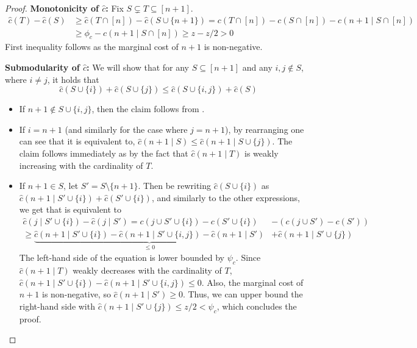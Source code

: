 \documentclass[11pt]{article}
\newcommand{\hc}{\hat{c}}
\begin{document}
\begin{proof}
    \textbf{Monotonicity of $\hc$:} 
    Fix $S \subsetneq T \subseteq [n+1]$. 
    \begin{align*}
            \hc(T) - \hc(S) 
            &\ge 
            \hc(T \cap [n]) - \hc(S \cup \{n+1\}) 
            = c(T\cap [n]) - c(S\cap [n]) - c(n+1\mid S\cap[n]) \\
            &\ge \phi_{c} - c(n+1\mid S\cap[n]) 
            \ge z - z/2 
            > 0
    \end{align*}
    First inequality follows as the marginal cost of $n+1$ is non-negative.  
    
    \textbf{Submodularity of $\hc$:} 
    We will show that for any $S \subseteq [n+1]$ and any $i,j \notin S$, where $i \ne j$, it holds that 
    \begin{equation}\label{eq:hcSupMod}
        \hc(S \cup \{i\}) + \hc(S \cup \{j\}) \le \hc(S \cup \{i,j\}) + \hc(S)
    \end{equation}
    
    \begin{itemize}
    \setlength\itemsep{-0.25em}
    \item If $n+1 \notin S \cup \{i,j\}$, then the claim follows from .

    \item If $i=n+1$ (and similarly for the case where $j=n+1$), by rearranging  one can see that it is equivalent to,
    $\hc(n+1 \mid S) \le \hc(n+1 \mid S \cup \{j\})$. The claim follows immediately as by the fact that $\hc(n+1 \mid T)$ is weakly increasing with the cardinality of $T$.

    \item If $n+1 \in S$, let $S' = S \setminus \{n+1\}$. 
    Then be rewriting $\hc(S \cup \{i\})$ as $\hc(n+1 \mid S' \cup \{i\}) + \hc(S'\cup\{i\})$, and similarly to the other expressions, we get that 
     is equivalent to
    \begin{align*}
    \hc(j \mid S' \cup \{i\}) - \hc(j \mid S')
    = c(j \cup S' \cup \{i\}) - c(S' \cup \{i\}) &- (c(j \cup S') - c(S')) \\
    \ge 
    \underbrace{\hc(n+1 \mid S' \cup \{i\}) - \hc(n+1 \mid S'\cup\{i,j\})   - \hc(n+1 \mid S')}_{\le 0} &+ \hc(n+1 \mid S' \cup \{j\})
    \end{align*}
    The left-hand side of the equation is lower bounded by $\psi_{c}$. 
    Since $\hc(n+1 \mid T)$ weakly decreases with the cardinality of $T$, $\hc(n+1 \mid S' \cup \{i\}) - \hc(n+1 \mid S'\cup\{i,j\}) \le 0$. Also, the marginal cost of $n+1$ is non-negative, so $\hc(n+1 \mid S') \ge 0$. Thus, we can upper bound the right-hand side with
    $\hc(n+1 \mid S' \cup \{j\}) \le z/2 < \psi_{c}$, which concludes the proof.
    \end{itemize}
    

\end{proof}
\end{document}
